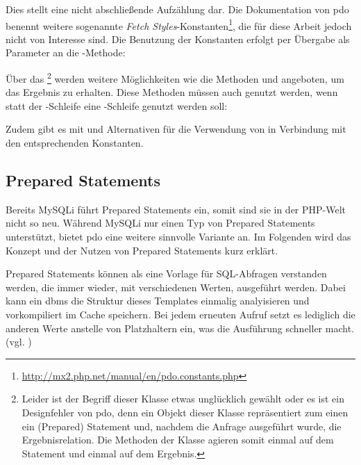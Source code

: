 Dies stellt eine nicht abschließende Aufzählung dar. Die Dokumentation von \gls{pdo} benennt weitere sogenannte \textit{Fetch Styles}-Konstanten\footnote{\url{http://mx2.php.net/manual/en/pdo.constants.php}}, die für diese Arbeit jedoch nicht von Interesse sind.
Die Benutzung der Konstanten erfolgt per Übergabe als Parameter an die -Methode:


Über das \footnote{Leider ist der Begriff dieser Klasse etwas unglücklich gewählt oder es ist ein Designfehler von \gls{pdo}, denn ein Objekt dieser Klasse repräsentiert zum einen ein (Prepared) Statement und, nachdem die Anfrage ausgeführt wurde, die Ergebnisrelation. Die Methoden der Klasse agieren somit einmal auf dem Statement und einmal auf dem Ergebnis.} werden weitere Möglichkeiten wie die Methoden  und  angeboten, um das Ergebnis zu erhalten. Diese Methoden müssen auch genutzt werden, wenn statt der -Schleife eine -Schleife genutzt werden soll:


Zudem gibt es mit  und  Alternativen für die Verwendung von  in Verbindung mit den entsprechenden Konstanten.

\subsection{Prepared Statements}
Bereits MySQLi führt Prepared Statements ein, somit sind sie in der PHP-Welt nicht so neu. Während MySQLi nur einen Typ von Prepared Statements unterstützt, bietet \gls{pdo} eine weitere sinnvolle Variante an. Im Folgenden wird das Konzept und der Nutzen von Prepared Statements kurz erklärt.

Prepared Statements können als eine Vorlage für SQL-Abfragen verstanden werden, die immer wieder, mit verschiedenen Werten, ausgeführt werden. Dabei kann ein \gls{dbms} die Struktur dieses Templates einmalig analyisieren und vorkompiliert im Cache speichern. Bei jedem erneuten Aufruf setzt es lediglich die anderen Werte anstelle von Platzhaltern ein, was die Ausführung schneller macht. (vgl. \cite[S. 75]{book:popel2007pdo})

